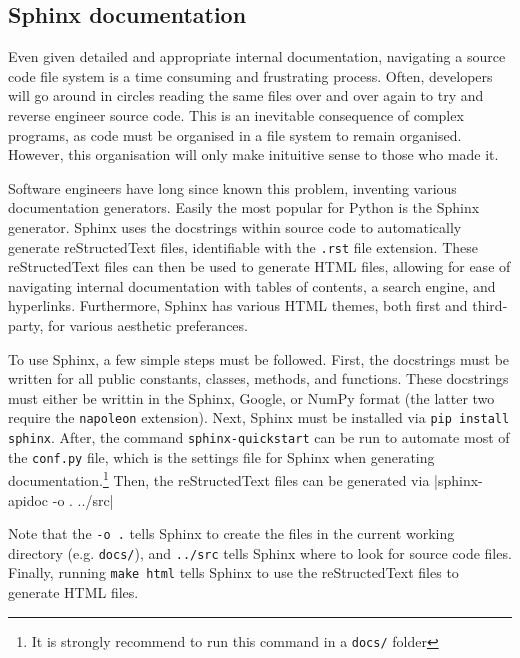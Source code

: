\documentclass[11pt]{article}
\begin{document}
\inputminted[linenos=true]{python}{python_examples/docstring.py}

\subsection{Sphinx documentation}

Even given detailed and appropriate internal documentation, navigating a source code file system is a time consuming and frustrating process. Often, developers will go around in circles reading the same files over and over again to try and reverse engineer source code. This is an inevitable consequence of complex programs, as code must be organised in a file system to remain organised. However, this organisation will only make inituitive sense to those who made it.

Software engineers have long since known this problem, inventing various documentation generators. Easily the most popular for Python is the Sphinx generator. Sphinx uses the docstrings within source code to automatically generate reStructedText files, identifiable with the \texttt{.rst} file extension. These reStructedText files can then be used to generate HTML files, allowing for ease of navigating internal documentation with tables of contents, a search engine, and hyperlinks. Furthermore, Sphinx has various HTML themes, both first and third-party, for various aesthetic preferances.

To use Sphinx, a few simple steps must be followed. First, the docstrings must be written for all public constants, classes, methods, and functions. These docstrings must either be writtin in the Sphinx, Google, or NumPy format (the latter two require the \texttt{napoleon} extension). Next, Sphinx must be installed via \texttt{pip install sphinx}. After, the command \texttt{sphinx-quickstart} can be run to automate most of the \texttt{conf.py} file, which is the settings file for Sphinx when generating documentation.\footnote{It is strongly recommend to run this command in a \texttt{docs/} folder} Then, the reStructedText files can be generated via
|sphinx-apidoc -o . ../src|

\noindent
Note that the \texttt{-o .} tells Sphinx to create the files in the current working directory (e.g. \texttt{docs/}), and \texttt{../src} tells Sphinx where to look for source code files. Finally, running \texttt{make html} tells Sphinx to use the reStructedText files to generate HTML files.
\end{document}

